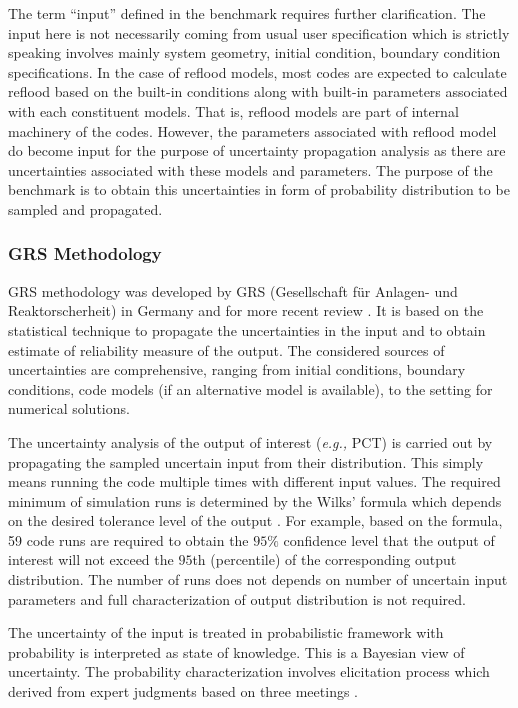 \documentclass[11pt,titlepage]{article}
\begin{document}
The term ``input'' defined in the benchmark requires further clarification. The input here is not necessarily coming from usual user specification which is strictly speaking involves mainly system geometry, initial condition, boundary condition specifications. In the case of reflood models, most codes are expected to calculate reflood based on the built-in conditions along with built-in parameters associated with each constituent models. That is, reflood models are part of internal machinery of the codes. However, the parameters associated with reflood model do become input for the purpose of uncertainty propagation analysis as there are uncertainties associated with these models and parameters. The purpose of the benchmark is to obtain this uncertainties in form of probability distribution to be sampled and propagated. 

\subsubsection{GRS Methodology}

GRS methodology was developed by GRS (Gesellschaft f\"ur Anlagen- und Reaktorscherheit) in Germany \cite{Glaeser1994} and for more recent review \cite{Glaeser2008}. It is based on the statistical technique to propagate the uncertainties in the input and to obtain estimate of reliability measure of the output. The considered sources of uncertainties are comprehensive, ranging from initial conditions, boundary conditions, code models (if an alternative model is available), to the setting for numerical solutions.

The uncertainty analysis of the output of interest (\textit{e.g.,} PCT) is carried out by propagating the sampled uncertain input from their distribution. This simply means running the code multiple times with different input values. The required minimum of simulation runs is determined by the Wilks' formula \cite{Wilks1942} which depends on the desired tolerance level of the output \cite{Glaeser2008}. For example, based on the formula, 59 code runs are required to obtain the $95\%$ confidence level that the output of interest will not exceed the $95$th (percentile) of the corresponding output distribution. The number of runs does not depends on number of uncertain input parameters and full characterization of output distribution is not required.

The uncertainty of the input is treated in probabilistic framework with probability is interpreted as state of knowledge. This is a Bayesian view of uncertainty. The probability characterization involves elicitation process which derived from expert judgments based on three meetings \cite{Glaeser1994}. 
\end{document}
